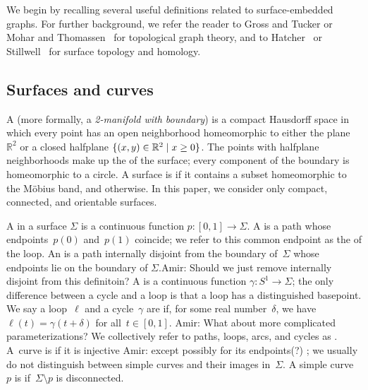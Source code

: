 \documentclass[letterpaper,review]{siamart190516}
\def\Real{\mathbb{R}}
\def\anote#1{\color{purple}Amir: #1 \color{black}}
\begin{document}


We begin by recalling several useful definitions related to surface-embedded graphs.  For further background, we refer the reader to Gross and Tucker \cite{gt-tgt-01} or Mohar and Thomassen~\cite{mt-gs-01} for topological graph theory, and to Hatcher~\cite{h-at-02} or Stillwell~\cite{s-ctcgt-93} for surface topology and homology.


\subsection{Surfaces and curves}
\label{SS:surfaces}

A  (more formally, a \emph{2-manifold with boundary}) is a compact Hausdorff space in which every point has an open neighborhood homeomorphic to either the plane $\Real^2$ or a closed halfplane $\set{(x,y)\in \Real^2\mid x\ge 0}$.  The points with halfplane neighborhoods make up the  of the surface; every component of the boundary is homeomorphic to a circle.
A surface is  if it contains a subset homeomorphic to
the M\"obius band, and  otherwise. In this paper, we consider only compact, connected, and orientable surfaces.

A  in a surface $\Sigma$ is a continuous function $p\colon [0,1]\to\Sigma$.
A  is a path whose endpoints~$p(0)$ and~$p(1)$ coincide;
we refer to this common endpoint as the  of the loop.
An  is a path internally disjoint from the boundary of~$\Sigma$
whose endpoints lie on the boundary of $\Sigma$.\anote{Should we just remove internally disjoint from this definitoin?}
A  is a continuous function $\gamma\colon S^1\to\Sigma$;
the only difference between a cycle and a loop is that a loop has a
distinguished basepoint.
We say a loop~$\ell$ and a cycle~$\gamma$ are  if, for some
real number~$\delta$, we have~$\ell(t) = \gamma(t + \delta)$ for
all~$t \in [0,1]$. \anote{What about more complicated parameterizations?}
We collectively refer to paths, loops, arcs, and cycles as .
A~curve is  if it is injective \anote{except possibly for its endpoints(?)}; we usually do not distinguish between simple curves and their images in~$\Sigma$.
A simple curve~$p$ is  if~$\Sigma \setminus p$ is disconnected.
\end{document}
